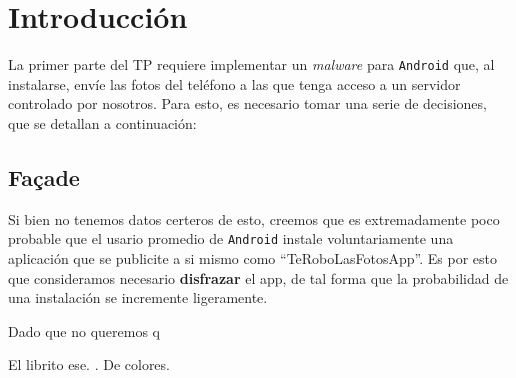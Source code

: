 \documentclass[10pt, a4paper,english,spanish]{article}
\renewcommand{\emph}[1]{\textit{#1}}
\begin{document}

\maketitle
\pagebreak

\tableofcontents
\pagebreak

\section{Introducción} %
\label{sec:introducci_n}

La primer parte del TP requiere implementar un \emph{malware} para \texttt{Android} que, al instalarse, envíe las fotos del teléfono a las que tenga acceso a un servidor controlado por nosotros. Para esto, es necesario tomar una serie de decisiones, que se detallan a continuación:

\subsection{Façade} %
\label{sub:fa_ade}
Si bien no tenemos datos certeros de esto, creemos que es extremadamente poco probable que el usario promedio de \texttt{Android} instale voluntariamente una aplicación que se publicite a si mismo como ``TeRoboLasFotosApp''. Es por esto que consideramos necesario \textbf{disfrazar} el app, de tal forma que la probabilidad de una instalación se incremente ligeramente. 

Dado que no queremos q



\begin{thebibliography}{8}
\raggedright

	El librito ese.
	.
	\newblock De colores.

\end{thebibliography}
\end{document}
